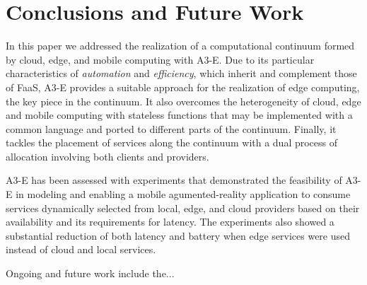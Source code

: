 \section{Conclusions and Future Work}\label{sec:conclusions}

In this paper we addressed the realization of a computational continuum formed by cloud, edge, and mobile computing with A3-E. Due to its particular characteristics of \textit{automation} and \textit{efficiency}, which inherit and complement those of FaaS, A3-E provides a suitable approach for the realization of edge computing, the key piece in the continuum. It also overcomes the heterogeneity of cloud, edge and mobile computing with stateless functions that may be implemented with a common language and ported to different parts of the continuum. Finally, it tackles the placement of services along the continuum with a dual process of allocation involving both clients and providers.

A3-E has been assessed with experiments that demonstrated the feasibility of A3-E in modeling and enabling a mobile agumented-reality application to consume services dynamically selected from local, edge, and cloud providers based on their availability and its requirements for latency. The experiments also showed a substantial reduction of both latency and battery when edge services were used instead of cloud and local services. 

Ongoing and future work include the...


 